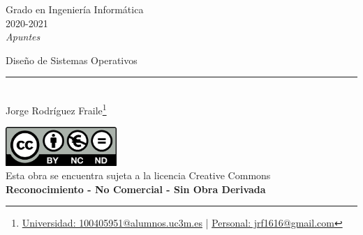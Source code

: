 \documentclass[12pt, twoside, openright]{report} %
\begin{document}

\begin{titlepage}
	\begin{sffamily}
		\color{azulUC3M}
		\begin{center}
			\begin{figure}[H] %
			\end{figure}
			\vspace{2.5cm}
			\begin{Large}
				Grado en Ingeniería Informática\\
				2020-2021\\
				\vspace{2cm}
				\textsl{Apuntes}\\
				\bigskip
			\end{Large}
			{\Huge Diseño de Sistemas Operativos}\\
			\vspace*{0.5cm}
			\rule{10.5cm}{0.1mm}\\
			\vspace*{0.9cm}
			{\LARGE Jorge Rodríguez Fraile\footnote{\href{mailto:100405951@alumnos.uc3m.es}{Universidad: 100405951@alumnos.uc3m.es}  |  \href{mailto:jrf1616@gmail.com}{Personal: jrf1616@gmail.com}}}\\
			\vspace*{1cm}
		\end{center}
		\vfill
		\color{black}
		\includegraphics[width=4.2cm]{img/creativecommons.png}\\
		Esta obra se encuentra sujeta a la licencia Creative Commons\\ \textbf{Reconocimiento - No Comercial - Sin Obra Derivada}
	\end{sffamily}
\end{titlepage}


\tableofcontents
\thispagestyle{fancy}
\end{document}

